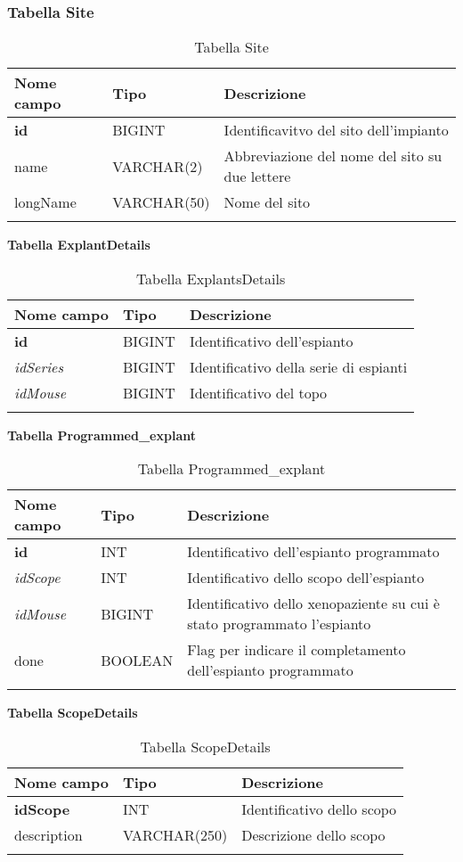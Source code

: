 \subsubsection{Tabella Site}

\begin{longtable}{|l|l|p{5.5cm}|}
\hline
\textbf{Nome campo} &	\textbf{Tipo} &	\textbf{Descrizione}\\ \hline
\textbf{id} &	BIGINT &	Identificavitvo del sito dell'impianto\\ \hline
name &	VARCHAR(2) & Abbreviazione del nome del sito su due lettere\\ \hline
longName &	VARCHAR(50) & Nome del sito\\ \hline
\caption{Tabella Site}
\end{longtable}

\textbf{Tabella ExplantDetails}

\begin{longtable}{|l|l|p{5.5cm}|}
\hline
\textbf{Nome campo} &	\textbf{Tipo} &	\textbf{Descrizione}\\ \hline
\textbf{id} &	BIGINT &	Identificativo dell'espianto\\ \hline
\textit{idSeries} &	BIGINT &	Identificativo della serie di espianti\\ \hline
\textit{idMouse} &	BIGINT &	Identificativo del topo\\ \hline
\caption{Tabella ExplantsDetails}
\end{longtable}

\textbf{Tabella Programmed\_explant}

\begin{longtable}{|l|l|p{5.5cm}|}
\hline
\textbf{Nome campo} &	\textbf{Tipo} &	\textbf{Descrizione}\\ \hline
\textbf{id} &	INT &	Identificativo dell'espianto programmato\\ \hline
\textit{idScope} &	INT &	Identificativo dello scopo dell'espianto\\ \hline
\textit{idMouse} &	BIGINT &	Identificativo dello xenopaziente su cui \`e stato programmato l'espianto\\ \hline
done &	BOOLEAN &	Flag per indicare il completamento dell'espianto programmato\\ \hline
\caption{Tabella Programmed\_explant}
\end{longtable}

\textbf{Tabella ScopeDetails}

\begin{longtable}{|l|l|p{5.5cm}|}
\hline
\textbf{Nome campo} &	\textbf{Tipo} &	\textbf{Descrizione}\\ \hline
\textbf{idScope} &	INT &	Identificativo dello scopo\\ \hline
description &	VARCHAR(250) &	Descrizione dello scopo\\ \hline
\caption{Tabella ScopeDetails}
\end{longtable}

